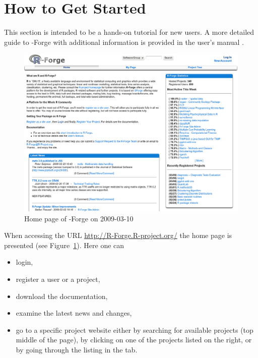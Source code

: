 \section{How to Get Started}
This section is intended to be a hands-on tutorial for new users. A
more detailed guide to \R{}-Forge with additional 
information is provided in the user's manual
\citep{forge:usermanual:2008}. 

\begin{figure}[th]
\centering
\includegraphics{rforge_main_snapshot_modified.png}
\caption{Home page of \R{}-Forge on 2009-03-10}
\label{fig:home_page}
\end{figure}

When accessing the URL \url{http://R-Forge.R-project.org/} the home
page is presented (see Figure~\ref{fig:home_page}). Here one can

\begin{itemize}
\item login,
\item register a user or a project,
\item download the documentation,
\item examine the latest news and changes,
\item go to a specific project website either by searching for available
  projects (top middle of the page), by clicking on one of the projects
  listed on the right, or by going through the listing in
  the  tab.
\end{itemize}

